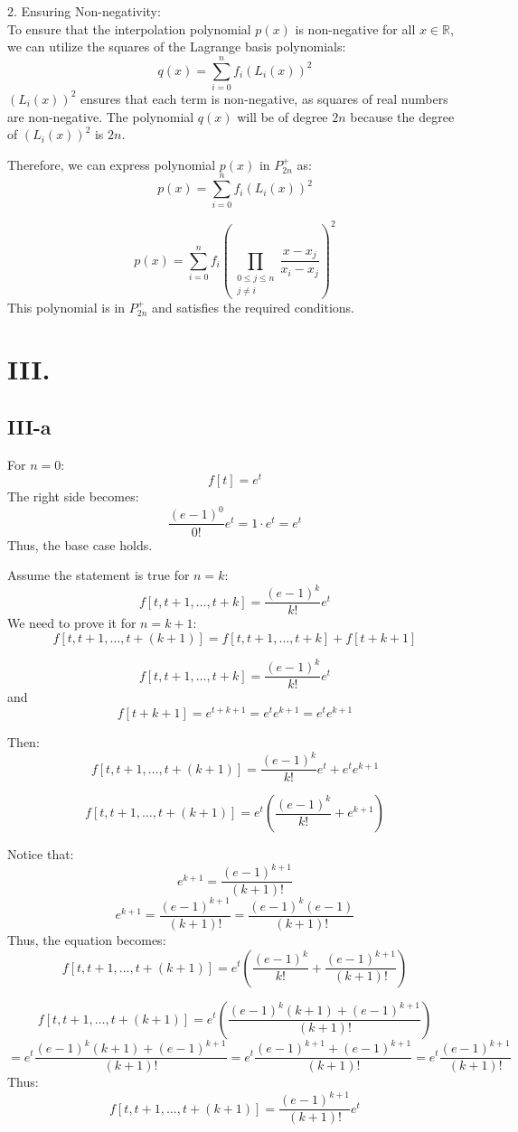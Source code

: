 \documentclass[a4paper]{article}
\begin{document}
2. Ensuring Non-negativity:\\
   To ensure that the interpolation polynomial \( p(x) \) is non-negative for all \( x \in \mathbb{R} \), we can utilize the squares of the Lagrange basis polynomials:
   \[
   q(x) = \sum_{i=0}^{n} f_i (L_i(x))^2
   \]
   \( (L_i(x))^2 \) ensures that each term is non-negative, as squares of real numbers are non-negative. The polynomial \( q(x) \) will be of degree \( 2n \) because the degree of \( (L_i(x))^2 \) is \( 2n \).

   Therefore, we can express  polynomial \( p(x) \) in \( P^+_{2n} \) as:
   \[
   p(x) = \sum_{i=0}^{n} f_i (L_i(x))^2
   \]
   
\[
p(x) = \sum_{i=0}^{n} f_i \left( \prod_{\substack{0 \leq j \leq n \\ j \neq i}} \frac{x - x_j}{x_i - x_j} \right)^2
\]
This polynomial is in \( P^+_{2n} \) and satisfies the required conditions.


\section*{III. }
\subsection*{III-a}

For \( n = 0 \):
\[f[t] = e^t\]
The right side becomes:
\[\frac{(e - 1)^0}{0!} e^t = 1 \cdot e^t = e^t\]
Thus, the base case holds.

Assume the statement is true for \( n = k \):
\[f[t, t + 1, \ldots, t + k] = \frac{(e - 1)^k}{k!} e^t\]
We need to prove it for \( n = k + 1 \):
\[f[t, t + 1, \ldots, t + (k + 1)] = f[t, t + 1, \ldots, t + k] + f[t + k + 1]\]

\[f[t, t + 1, \ldots, t + k] = \frac{(e - 1)^k}{k!} e^t\]
and 
\[f[t + k + 1] = e^{t + k + 1} = e^t e^{k + 1} = e^{t} e^{k + 1}\]

Then:
\[f[t, t + 1, \ldots, t + (k + 1)] = \frac{(e - 1)^k}{k!} e^t + e^{t} e^{k + 1}\]

\[f[t, t + 1, \ldots, t + (k + 1)] = e^t \left( \frac{(e - 1)^k}{k!} + e^{k + 1} \right)\]

Notice that:
\[e^{k + 1} = \frac{(e - 1)^{k + 1}}{(k + 1)!}\]
\[e^{k + 1} = \frac{(e - 1)^{k + 1}}{(k + 1)!} = \frac{(e - 1)^k (e - 1)}{(k + 1)!}\]
Thus, the equation becomes:
\[f[t, t + 1, \ldots, t + (k + 1)] = e^t \left( \frac{(e - 1)^k}{k!} + \frac{(e - 1)^{k + 1}}{(k + 1)!} \right)\]

\[f[t, t + 1, \ldots, t + (k + 1)] = e^t \left( \frac{(e - 1)^k (k + 1) + (e - 1)^{k + 1}}{(k + 1)!} \right)\]
\[= e^t \frac{(e - 1)^k (k + 1) + (e - 1)^{k + 1}}{(k + 1)!} = e^t \frac{(e - 1)^{k + 1} + (e - 1)^{k + 1}}{(k + 1)!} = e^t \frac{(e - 1)^{k + 1}}{(k + 1)!}\]
Thus:
\[f[t, t + 1, \ldots, t + (k + 1)] = \frac{(e - 1)^{k + 1}}{(k + 1)!} e^t\]
\end{document}
